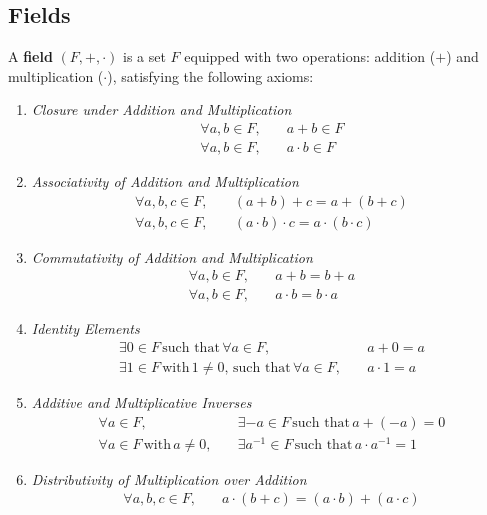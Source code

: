 \documentclass{article}
\begin{document}
\subsection{Fields}

A \textbf{field} $(F, +, \cdot)$ is a set $F$ equipped with two operations: addition ($+$) and multiplication ($\cdot$), satisfying the following axioms:

\begin{enumerate}
    \item \textit{Closure under Addition and Multiplication}
    \begin{align*}
        \forall a, b \in F, \quad & a + b \in F \\
        \forall a, b \in F, \quad & a \cdot b \in F
    \end{align*}
    
    \item \textit{Associativity of Addition and Multiplication}
    \begin{align*}
        \forall a, b, c \in F, \quad & (a + b) + c = a + (b + c) \\
        \forall a, b, c \in F, \quad & (a \cdot b) \cdot c = a \cdot (b \cdot c)
    \end{align*}
    
    \item \textit{Commutativity of Addition and Multiplication}
    \begin{align*}
        \forall a, b \in F, \quad & a + b = b + a \\
        \forall a, b \in F, \quad & a \cdot b = b \cdot a
    \end{align*}
    
    \item \textit{Identity Elements}
    \begin{align*}
        \exists 0 \in F \, \text{such that} \, \forall a \in F, \quad & a + 0 = a \\
        \exists 1 \in F \, \text{with} \, 1 \neq 0, \, \text{such that} \, \forall a \in F, \quad & a \cdot 1 = a
    \end{align*}
    
    \item \textit{Additive and Multiplicative Inverses}
    \begin{align*}
        \forall a \in F, \quad & \exists -a \in F \, \text{such that} \, a + (-a) = 0 \\
        \forall a \in F \, \text{with} \, a \neq 0, \quad & \exists a^{-1} \in F \, \text{such that} \, a \cdot a^{-1} = 1
    \end{align*}
    
    \item \textit{Distributivity of Multiplication over Addition}
    \begin{align*}
        \forall a, b, c \in F, \quad & a \cdot (b + c) = (a \cdot b) + (a \cdot c)
    \end{align*}
\end{enumerate}
\end{document}
